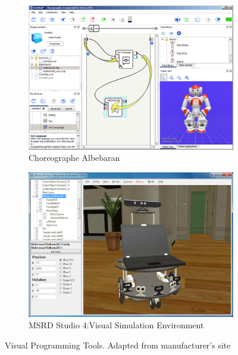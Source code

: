 \begin{figure}[H]
\centering
\begin{subfigure}[b]{0.5\textwidth}
\includegraphics[width=\textwidth]{assets/helloworld_cho_dlg_05.png}
\caption{Choreographe Albebaran}
\label{fig:choreographe}
\end{subfigure}%
\begin{subfigure}[b]{0.5\textwidth}
\includegraphics[width=\textwidth]{assets/MSRD4_VSE2.png}
\caption{MSRD Studio 4:Visual Simulation Environment}
\label{fig:msrd4_vse}
\end{subfigure}%
\caption[Visual Programming Tools]{Visual Programming Tools. {Adapted from manufacturer's site}}
\label{fig:visprog}
\end{figure}
